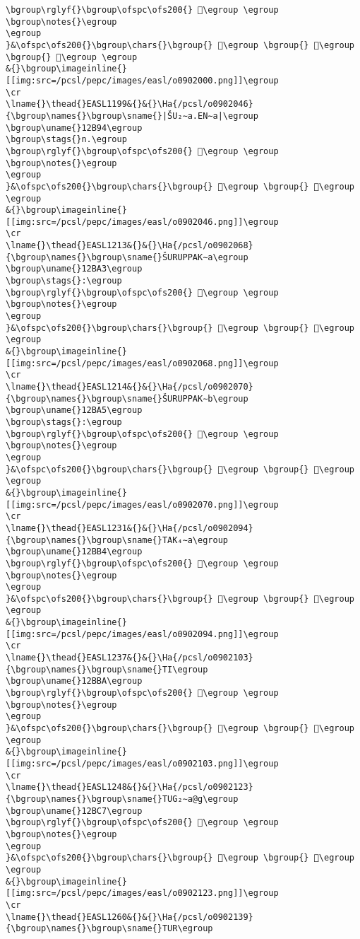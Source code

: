 \begin{verbatim}
\bgroup\rglyf{}\bgroup\ofspc\ofs200{} 𒭺\egroup \egroup
\bgroup\notes{}\egroup
\egroup
}&\ofspc\ofs200{}\bgroup\chars{}\bgroup{} 𒭸\egroup \bgroup{} 𒭹\egroup \bgroup{} 𒭺\egroup \egroup
&{}\bgroup\imageinline{}[[img:src=/pcsl/pepc/images/easl/o0902000.png]]\egroup
\cr
\lname{}\thead{}EASL1199&{}&{}\Ha{/pcsl/o0902046}{\bgroup\names{}\bgroup\sname{}|ŠU₂∼a.EN∼a|\egroup
\bgroup\uname{}12B94\egroup
\bgroup\stags{}n.\egroup
\bgroup\rglyf{}\bgroup\ofspc\ofs200{} 𒮔\egroup \egroup
\bgroup\notes{}\egroup
\egroup
}&\ofspc\ofs200{}\bgroup\chars{}\bgroup{} 𒮓\egroup \bgroup{} 𒮔\egroup \egroup
&{}\bgroup\imageinline{}[[img:src=/pcsl/pepc/images/easl/o0902046.png]]\egroup
\cr
\lname{}\thead{}EASL1213&{}&{}\Ha{/pcsl/o0902068}{\bgroup\names{}\bgroup\sname{}ŠURUPPAK∼a\egroup
\bgroup\uname{}12BA3\egroup
\bgroup\stags{}:\egroup
\bgroup\rglyf{}\bgroup\ofspc\ofs200{} 𒮣\egroup \egroup
\bgroup\notes{}\egroup
\egroup
}&\ofspc\ofs200{}\bgroup\chars{}\bgroup{} 𒮢\egroup \bgroup{} 𒮣\egroup \egroup
&{}\bgroup\imageinline{}[[img:src=/pcsl/pepc/images/easl/o0902068.png]]\egroup
\cr
\lname{}\thead{}EASL1214&{}&{}\Ha{/pcsl/o0902070}{\bgroup\names{}\bgroup\sname{}ŠURUPPAK∼b\egroup
\bgroup\uname{}12BA5\egroup
\bgroup\stags{}:\egroup
\bgroup\rglyf{}\bgroup\ofspc\ofs200{} 𒮥\egroup \egroup
\bgroup\notes{}\egroup
\egroup
}&\ofspc\ofs200{}\bgroup\chars{}\bgroup{} 𒮤\egroup \bgroup{} 𒮥\egroup \egroup
&{}\bgroup\imageinline{}[[img:src=/pcsl/pepc/images/easl/o0902070.png]]\egroup
\cr
\lname{}\thead{}EASL1231&{}&{}\Ha{/pcsl/o0902094}{\bgroup\names{}\bgroup\sname{}TAK₄∼a\egroup
\bgroup\uname{}12BB4\egroup
\bgroup\rglyf{}\bgroup\ofspc\ofs200{} 𒮴\egroup \egroup
\bgroup\notes{}\egroup
\egroup
}&\ofspc\ofs200{}\bgroup\chars{}\bgroup{} 𒮶\egroup \bgroup{} 𒮴\egroup \egroup
&{}\bgroup\imageinline{}[[img:src=/pcsl/pepc/images/easl/o0902094.png]]\egroup
\cr
\lname{}\thead{}EASL1237&{}&{}\Ha{/pcsl/o0902103}{\bgroup\names{}\bgroup\sname{}TI\egroup
\bgroup\uname{}12BBA\egroup
\bgroup\rglyf{}\bgroup\ofspc\ofs200{} 𒮺\egroup \egroup
\bgroup\notes{}\egroup
\egroup
}&\ofspc\ofs200{}\bgroup\chars{}\bgroup{} 𒮺\egroup \bgroup{} 𒮾\egroup \egroup
&{}\bgroup\imageinline{}[[img:src=/pcsl/pepc/images/easl/o0902103.png]]\egroup
\cr
\lname{}\thead{}EASL1248&{}&{}\Ha{/pcsl/o0902123}{\bgroup\names{}\bgroup\sname{}TUG₂∼a@g\egroup
\bgroup\uname{}12BC7\egroup
\bgroup\rglyf{}\bgroup\ofspc\ofs200{} 𒯇\egroup \egroup
\bgroup\notes{}\egroup
\egroup
}&\ofspc\ofs200{}\bgroup\chars{}\bgroup{} 𒯆\egroup \bgroup{} 𒯇\egroup \egroup
&{}\bgroup\imageinline{}[[img:src=/pcsl/pepc/images/easl/o0902123.png]]\egroup
\cr
\lname{}\thead{}EASL1260&{}&{}\Ha{/pcsl/o0902139}{\bgroup\names{}\bgroup\sname{}TUR\egroup

\end{verbatim}
